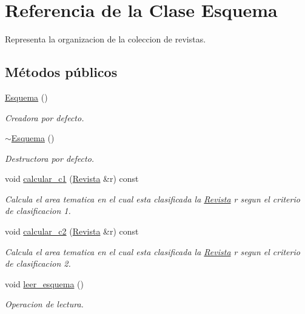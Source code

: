 \hypertarget{class_esquema}{\section{Referencia de la Clase Esquema}
\label{class_esquema}
}


Representa la organizacion de la coleccion de revistas.  


\subsection*{Métodos públicos}
\begin{DoxyCompactItemize}
\item 
\hyperlink{class_esquema_af1460486d823ed42510655affd487fa1}{Esquema} ()
\begin{DoxyCompactList}\small\item\em Creadora por defecto. \end{DoxyCompactList}\item 
\hyperlink{class_esquema_a35493f2aa427f0cea80f7ece50d22f6e}{$\sim$\-Esquema} ()
\begin{DoxyCompactList}\small\item\em Destructora por defecto. \end{DoxyCompactList}\item 
void \hyperlink{class_esquema_a2a237e94381f752b6f5cb582987b0570}{calcular\-\_\-c1} (\hyperlink{class_revista}{Revista} \&r) const 
\begin{DoxyCompactList}\small\item\em Calcula el area tematica en el cual esta clasificada la \hyperlink{class_revista}{Revista} r segun el criterio de clasificacion 1. \end{DoxyCompactList}\item 
void \hyperlink{class_esquema_a50c270ca5ba9dbd129fe047fb7a18363}{calcular\-\_\-c2} (\hyperlink{class_revista}{Revista} \&r) const 
\begin{DoxyCompactList}\small\item\em Calcula el area tematica en el cual esta clasificada la \hyperlink{class_revista}{Revista} r segun el criterio de clasificacion 2. \end{DoxyCompactList}\item 
void \hyperlink{class_esquema_ad6c7e82a2322bd19412efa51d2005ede}{leer\-\_\-esquema} ()
\begin{DoxyCompactList}\small\item\em Operacion de lectura. \end{DoxyCompactList}\end{DoxyCompactItemize}
